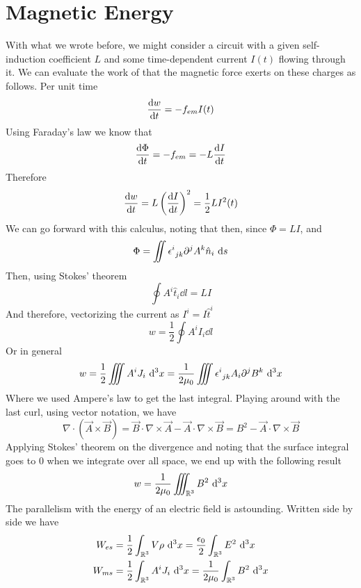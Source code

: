 \documentclass[../electromagnetism]{subfiles}
\begin{document}
\section{Magnetic Energy}
With what we wrote before, we might consider a circuit with a given self-induction coefficient $L$ and some time-dependent current $I(t)$ flowing through it. We can evaluate the work of that the magnetic force exerts on these charges as follows. Per unit time
\begin{equation}
	\dv{w}{t}=-f_{em}I(t)
	\label{eq:work/timemag}
\end{equation}
Using Faraday's law we know that
\begin{equation*}
	\dv{\Phi}{t}=-f_{em}=-L\dv{I}{t}
\end{equation*}
Therefore 
\begin{equation}
	\dv{w}{t}=L\left( \dv{I}{t} \right)^2=\frac{1}{2}LI^2(t)
	\label{eq:mfenfaraday1}
\end{equation}
We can go forward with this calculus, noting that then, since $\Phi=LI$, and 
\begin{equation*}
	\Phi=\iint\epsilon^{i}_{\ jk}\partial^jA^k\hat{n}_i\ \mathrm{d} s
\end{equation*}
Then, using Stokes' theorem
\begin{equation*}
	\oint A^i\hat{t}_i\dd l=LI
\end{equation*}
And therefore, vectorizing the current as $I^i=I\hat{t}^i$
\begin{equation*}
	w=\frac{1}{2}\oint A^iI_i\dd l
\end{equation*}
Or in general
\begin{equation}
	w=\frac{1}{2}\iiint A^iJ_i\ \mathrm{d}^3x=\frac{1}{2\mu_0}\iiint\epsilon^{i}_{\ jk}A_i\partial^jB^k\ \mathrm{d}^3x
	\label{eq:workmagnetic}
\end{equation}
Where we used Ampere's law to get the last integral. Playing around with the last curl, using vector notation, we have
\begin{equation*}
	\nabla\cdot(\vec{A}\times\vec{B})=\vec{B}\cdot\nabla\times\vec{A}-\vec{A}\cdot\nabla\times\vec{B}=B^2-\vec{A}\cdot\nabla\times\vec{B}
\end{equation*}
Applying Stokes' theorem on the divergence and noting that the surface integral goes to 0 when we integrate over all space, we end up with the following result
\begin{equation*}
	w=\frac{1}{2\mu_0}\iiint_{\operatorname{\mathbb{R}}^3}B^2\ \mathrm{d}^3x
\end{equation*}
The parallelism with the energy of an electric field is astounding. Written side by side we have
\begin{equation}
	\begin{aligned}
		W_{es}&=\frac{1}{2}\int_{\operatorname{\mathbb{R}}^3}V\rho\ \mathrm{d}^3x=\frac{\epsilon_0}{2}\int_{\operatorname{\mathbb{R}}^3}E^2\ \mathrm{d}^3x\\
		W_{ms}&=\frac{1}{2}\int_{\operatorname{\mathbb{R}}^3}A^iJ_i\ \mathrm{d}^3x=\frac{1}{2\mu_0}\int_{\operatorname{\mathbb{R}}^3}B^2\ \mathrm{d}^3x
	\end{aligned}
	\label{eq:esmsenergy}
\end{equation}
\end{document}
